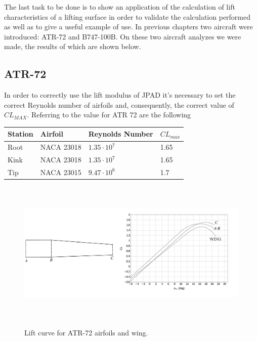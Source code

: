 The last task to be done is to show an application of the calculation of lift characteristics of a lifting surface in order
to validate the calculation performed as well as to give a useful example of use. In previous chapters two aircraft were introduced:
ATR-72 and B747-100B. On these two aircraft analyzes we were made, the results of which are shown below.\\

\subsection{ATR-72}

In order to correctly use the lift modulus of JPAD it's necessary to set the correct Reynolds number of airfoils and, consequently, the correct value of $CL_{MAX}$. Referring to \cite{Abbott} the value for ATR 72 are the following

\begin{center}
	\begin{tabular}{ | l | l | l | l |}
		\hline
		Station & Airfoil & Reynolds Number & $CL_{max}$ \\ \hline
		Root & NACA 23018 & $1.35 \cdot 10^7$ & 1.65 \\ \hline
		Kink & NACA 23018 &  $1.35 \cdot 10^7$ & 1.65 \\ \hline
		Tip & NACA 23015 & $9.47 \cdot 10^6$ & 1.7 \\
		\hline
	\end{tabular}
\end{center}


\begin{figure}[H]
	\centering
	{\includegraphics[height=6.9cm]{Immagini/ATR_Topview.pdf}} 
	\caption{Lift curve for ATR-72 airfoils and wing.}
	\label{fig:clalf}
\end{figure}

